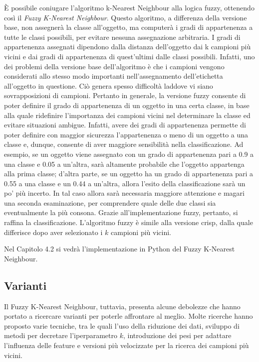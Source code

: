 \documentclass[11pt,  oneside, openany]{book}
\begin{document}
\`E possibile coniugare l'algoritmo k-Nearest Neighbour alla logica fuzzy, ottenendo così il \textit{Fuzzy K-Nearest Neighbour}. Questo algoritmo, a differenza della versione base, non assegnerà la classe all'oggetto, ma computerà i gradi di appartenenza a tutte le classi possibili, per evitare nessuna assegnazione arbitraria. I gradi di appartenenza assegnati dipendono dalla distanza dell'oggetto dai k campioni più vicini e dai gradi di appartenenza di quest'ultimi dalle classi possibili. Infatti, uno dei problemi della versione base dell'algoritmo è che i campioni vengono considerati allo stesso modo importanti nell'assegnamento dell'etichetta all'oggetto in questione. Ciò genera spesso difficoltà laddove vi siano sovrapposizioni di campioni. Pertanto in generale, la versione fuzzy consente di poter definire il grado di appartenenza di un oggetto in una certa classe, in base alla quale ridefinire l'importanza dei campioni vicini nel determinare la classe ed evitare situazioni ambigue. Infatti, avere dei gradi di appartenenza permette di poter definire con maggior sicurezza l'appartenenza o meno di un oggetto a una classe e, dunque, consente di aver maggiore sensibilità nella classificazione. Ad esempio, se un oggetto viene assegnato con un grado di appartenenza pari a 0.9 a una classe e 0.05 a un'altra, sarà altamente probabile che l'oggetto appartenga alla prima classe; d'altra parte, se un oggetto ha un grado di appartenenza pari a 0.55 a una classe e un 0.44 a un'altra, allora l'esito della classificazione sarà un po' più incerto. In tal caso allora sarà necessaria maggiore attenzione e magari una seconda esaminazione, per comprendere quale delle due classi sia eventualmente la più consona. Grazie all'implementazione fuzzy, pertanto, si raffina la classificazione. L'algoritmo fuzzy è simile alla versione crisp, dalla quale differisce dopo aver selezionato i $k$ campioni più vicini. 

Nel Capitolo 4.2 si vedrà l'implementazione in Python del Fuzzy K-Nearest Neighbour. 


\subsection{Varianti}

Il Fuzzy K-Nearest Neighbour, tuttavia, presenta alcune debolezze che hanno portato a ricercare varianti per poterle affrontare al meglio. Molte ricerche hanno proposto varie tecniche, tra le quali l'uso della riduzione dei dati, sviluppo di metodi per decretare l'iperparametro $k$, introduzione dei pesi per adattare l'influenza delle feature e versioni più velocizzate per la ricerca dei campioni più vicini. 
\end{document}
